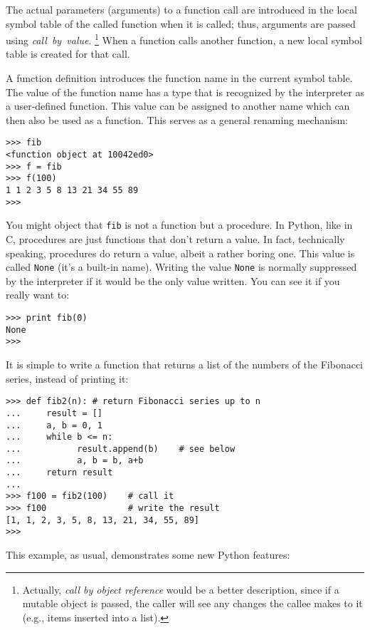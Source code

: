 The actual parameters (arguments) to a function call are introduced in
the local symbol table of the called function when it is called; thus,
arguments are passed using {\em call\ by\ value}.%
\footnote{
	 Actually, {\em call  by  object reference} would be a better
	 description, since if a mutable object is passed, the caller
	 will see any changes the callee makes to it (e.g., items
	 inserted into a list).
}
When a function calls another function, a new local symbol table is
created for that call.

A function definition introduces the function name in the
current
symbol table.  The value
of the function name
has a type that is recognized by the interpreter as a user-defined
function.  This value can be assigned to another name which can then
also be used as a function.  This serves as a general renaming
mechanism:

\bcode\begin{verbatim}
>>> fib
<function object at 10042ed0>
>>> f = fib
>>> f(100)
1 1 2 3 5 8 13 21 34 55 89
>>> 
\end{verbatim}\ecode
%
You might object that {\tt fib} is not a function but a procedure.  In
Python, like in C, procedures are just functions that don't return a
value.  In fact, technically speaking, procedures do return a value,
albeit a rather boring one.  This value is called {\tt None} (it's a
built-in name).  Writing the value {\tt None} is normally suppressed by
the interpreter if it would be the only value written.  You can see it
if you really want to:

\bcode\begin{verbatim}
>>> print fib(0)
None
>>> 
\end{verbatim}\ecode
%
It is simple to write a function that returns a list of the numbers of
the Fibonacci series, instead of printing it:

\bcode\begin{verbatim}
>>> def fib2(n): # return Fibonacci series up to n
...     result = []
...     a, b = 0, 1
...     while b <= n:
...           result.append(b)    # see below
...           a, b = b, a+b
...     return result
... 
>>> f100 = fib2(100)    # call it
>>> f100                # write the result
[1, 1, 2, 3, 5, 8, 13, 21, 34, 55, 89]
>>> 
\end{verbatim}\ecode
%
This example, as usual, demonstrates some new Python features:

